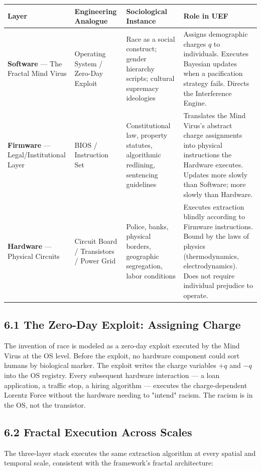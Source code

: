 \documentclass[12pt]{book}
\numberwithin{equation}{chapter}
\begin{document}
\begin{center}
\begin{tabular}{llll}
\toprule
Layer & Engineering Analogue & Sociological Instance & Role in UEF  \\
\midrule
\textbf{Software} — The Fractal Mind Virus & Operating System / Zero-Day Exploit & Race as a social construct; gender hierarchy scripts; cultural supremacy ideologies & Assigns demographic charges $q$ to individuals. Executes Bayesian updates when a pacification strategy fails. Directs the Interference Engine.  \\
\textbf{Firmware} — Legal/Institutional Layer & BIOS / Instruction Set & Constitutional law, property statutes, algorithmic redlining, sentencing guidelines & Translates the Mind Virus's abstract charge assignments into physical instructions the Hardware executes. Updates more slowly than Software; more slowly than Hardware.  \\
\textbf{Hardware} — Physical Circuits & Circuit Board / Transistors / Power Grid & Police, banks, physical borders, geographic segregation, labor conditions & Executes extraction blindly according to Firmware instructions. Bound by the laws of physics (thermodynamics, electrodynamics). Does not require individual prejudice to operate.  \\
\bottomrule
\end{tabular}
\end{center}

\subsection{6.1 The Zero-Day Exploit: Assigning Charge}

    The invention of race is modeled as a zero-day exploit executed by the Mind Virus at the OS level. Before the exploit, no hardware component could sort humans by biological marker. The exploit writes the charge variables $+q$ and $-q$ into the OS registry. Every subsequent hardware interaction — a loan application, a traffic stop, a hiring algorithm — executes the charge-dependent Lorentz Force without the hardware needing to "intend" racism. The racism is in the OS, not the transistor.
  

\subsection{6.2 Fractal Execution Across Scales}

    The three-layer stack executes the same extraction algorithm at every spatial and temporal scale, consistent with the framework's fractal architecture:
  
\end{document}
